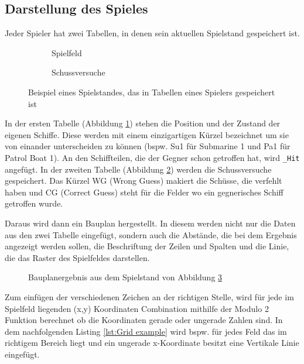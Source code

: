 \documentclass{article}
\begin{document}
\subsection{Darstellung des Spieles}
    Jeder Spieler hat zwei Tabellen, in denen sein aktuellen Spielstand gespeichert ist.

\begin{figure}[H]
    \begin{subfigure}{0.50\textwidth}
    \centering
    
    \caption{Spielfeld}
    \label{fig:board}
    \end{subfigure}
    \begin{subfigure}{0.50\textwidth}
    \centering
    
    \caption{Schussversuche}
    \label{fig:guesses}
\end{subfigure}
\caption{Beispiel eines Spielstandes, das in Tabellen eines Spielers gespeichert ist}
\label{fig:Boards}
\end{figure}

\par
    In der ersten Tabelle (Abbildung \ref{fig:board}) stehen die Position und der Zustand der eigenen Schiffe. Diese werden mit einem einzigartigen Kürzel bezeichnet um sie von einander unterscheiden zu können (bspw. Su1 für Submarine 1 und Pa1 für Patrol Boat 1). An den Schiffteilen, die der Gegner schon getroffen hat, wird \verb$_Hit$ angefügt. In der zweiten Tabelle (Abbildung \ref{fig:guesses}) werden die Schussversuche gespeichert. Das Kürzel WG (Wrong Guess) makiert die Schüsse, die verfehlt haben und CG (Correct Guess) steht für die Felder wo ein gegnerisches Schiff getroffen wurde.\newline

\par
    Daraus wird dann ein Bauplan hergestellt. In diesem werden nicht nur die Daten aus den zwei Tabelle eingefügt, sondern auch die Abstände, die bei dem Ergebnis angezeigt werden sollen, die Beschriftung der Zeilen und Spalten und die Linie, die das Raster des Spielfeldes darstellen.

\begin{figure}[H]
    \centering
    
    \caption{Bauplanergebnis aus dem Spielstand von Abbildung \ref{fig:Boards}}
    \label{fig:blueprint}
\end{figure}

\par
    Zum einfügen der verschiedenen Zeichen an der richtigen Stelle, wird für jede im Spielfeld liegenden (x,y) Koordinaten Combination mithilfe der Modulo 2 Funktion berechnet ob die Koordinaten gerade oder ungerade Zahlen sind. In dem nachfolgenden Listing \ref{lst:Grid example} wird bspw. für jedes Feld das im richtigem Bereich liegt und ein ungerade x-Koordinate besitzt eine Vertikale Linie eingefügt.
\end{document}
